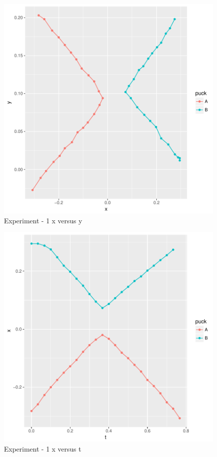 \documentclass[11pt]{article}
\begin{document}
\begin{figure}[!h]
\includegraphics{lab5-v1-fig-exp-1xy}
     \caption{Experiment - 1 x versus y}
     \label{exp-1xy}
\end{figure}

\begin{figure}[!h]
\includegraphics{lab5-v1-fig-exp-1xt}
     \caption{Experiment - 1 x versus t}
     \label{exp-1xt}
\end{figure}
\end{document}
